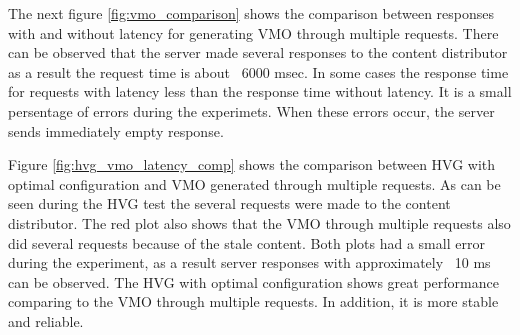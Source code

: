 The next figure \ref{fig:vmo_comparison} shows the comparison between responses with and without latency for generating VMO through multiple requests. There can be observed that the server made several responses to the content distributor as a result the request time is about ~6000 msec. In some cases the response time for requests with latency less than the response time without latency. It is a small persentage of errors during the experimets. When these errors occur, the server sends immediately empty response.


Figure \ref{fig:hvg_vmo_latency_comp} shows the comparison between HVG with optimal configuration and VMO generated through multiple requests. As can be seen during the HVG test the several requests were made to the content distributor. The red plot also shows that the VMO through multiple requests also did several requests because of the stale content. Both plots had a small error during the experiment, as a result server responses with approximately ~10 ms can be observed. The HVG with optimal configuration shows great performance comparing to the VMO through multiple requests. In addition, it is more stable and reliable. 




\newpage

